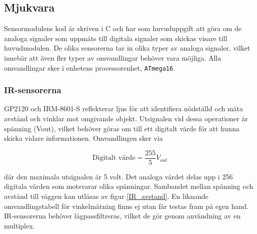 \documentclass[11pt]{article}
\begin{document}
\begin{flushleft}


\subsection{Mjukvara}
Sensormodulens kod är skriven i C och har som huvuduppgift att göra om de analoga signaler som uppmäts till digitala signaler som skickas visare till huvudmodulen. De olika sensorerna tar in olika typer av analoga signaler, vilket innebär att även fler typer av omvandlingar behöver vara möjliga. Alla omvandlingar sker i enhetens processorenhet, \verb+ATmega16+. 

\subsubsection{IR-sensorerna}
GP2120 och IRM-8601-S reflekterar ljus för att identifiera nödställd och mäta avstånd och vinklar mot omgivande objekt. Utsignalen vid dessa operationer är spänning (Vout), vilket behöver göras om till ett digitalt värde för att kunna skicka vidare informationen. Omvandlingen sker via 

\begin{equation*}
	\textrm{Digitalt värde} = \frac{255}{5}V_{out}
\end{equation*}

där den maximala utsignalen är 5 volt. Det analoga värdet delas upp i 256 digitala värden som motsvarar olika spänningar. Sambandet mellan spänning och avstånd till väggen kan utläsas av figur \ref{IR_avstand}. En liknande omvandlingstabell för vinkelmätning finns ej utan får testas fram på egen hand. IR-sensorerna behöver lågpassfiltreras, vilket de gör genom användning av en multiplex.


\end{flushleft}
\end{document}
